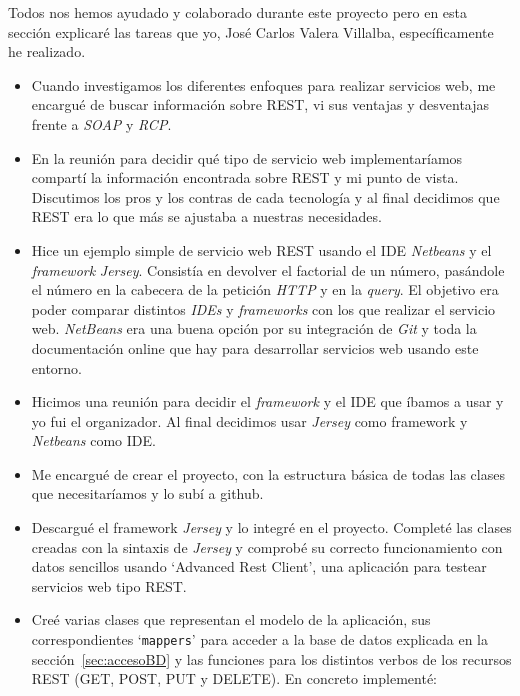 
Todos nos hemos ayudado y colaborado durante este proyecto pero en esta sección explicaré las tareas que yo, José Carlos Valera Villalba, específicamente he realizado.

\begin{itemize}
\item
Cuando investigamos los diferentes enfoques para realizar servicios web, me encargué de buscar información sobre REST, vi sus ventajas y desventajas frente a \textit{SOAP} y \textit{RCP}.

\item
En la reunión para decidir qué tipo de servicio web implementaríamos compartí la información encontrada sobre REST y mi punto de vista. Discutimos los pros y los contras de cada tecnología y al final decidimos que REST era lo que más se ajustaba a nuestras necesidades.

\item
Hice un ejemplo simple de servicio web REST usando el IDE \textit{Netbeans} y el \emph{framework} \textit{Jersey}. Consistía en devolver el factorial de un número, pasándole el número en la cabecera de la petición \textit{HTTP} y en la \textit{query}. El objetivo era poder comparar distintos \textit{IDEs} y  \emph{frameworks} con los que realizar el servicio web. \textit{NetBeans} era una buena opción por su integración de \textit{Git} y toda la documentación online que hay para desarrollar servicios web usando este entorno.

\item
Hicimos una reunión para decidir el \emph{framework} y el IDE que íbamos a usar y yo fui el organizador. Al final decidimos usar \textit{Jersey} como framework y \textit{Netbeans} como IDE.

\item
Me encargué de crear el proyecto, con la estructura básica de todas las clases que necesitaríamos y lo subí a github.

\item
Descargué el framework \textit{Jersey} y lo integré en el proyecto. Completé las clases creadas con la sintaxis de \textit{Jersey} y comprobé su correcto funcionamiento con datos sencillos usando `Advanced Rest Client', una aplicación para testear servicios web tipo REST.

\item
Creé varias clases que representan el modelo de la aplicación, sus correspondientes `\texttt{mappers}' para acceder a la base de datos explicada en la sección~\ref{sec:accesoBD} y las funciones para los distintos verbos de los recursos REST (GET, POST, PUT y DELETE). En concreto implementé:


\end{itemize}
